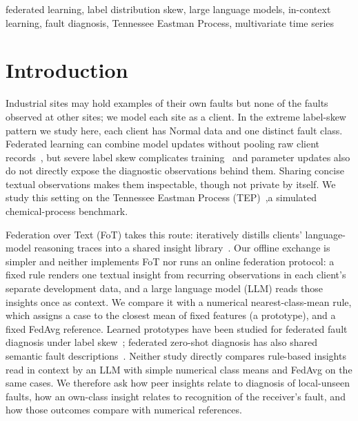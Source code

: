 \documentclass[conference]{IEEEtran}
\newcommand{\TEP}{TEP}
\begin{document}
\begin{IEEEkeywords}
federated learning, label distribution skew, large language models, in-context learning, fault diagnosis, Tennessee Eastman Process, multivariate time series
\end{IEEEkeywords}

\section{Introduction}
\label{sec:intro}
Industrial sites may hold examples of their own faults but none of the faults observed at other sites; we model each site as a client. In the extreme label-skew pattern we study here, each client has Normal data and one distinct fault class. Federated learning can combine model updates without pooling raw client records~\cite{mcmahan2017fedavg}, but severe label skew complicates training~\cite{li2022noniid} and parameter updates also do not directly expose the diagnostic observations behind them. Sharing concise textual observations makes them inspectable, though not private by itself. We study this setting on the Tennessee Eastman Process (\TEP{})~\cite{downs1993tep,bathelt2015tep},a simulated chemical-process benchmark.

Federation over Text (FoT)\cite{yao2026fot} takes this route: iteratively distills clients' language-model reasoning traces into a shared insight library~\cite{yao2026fot}. Our offline exchange is simpler and neither implements FoT nor runs an online federation protocol: a fixed rule renders one textual insight from recurring observations in each client's separate development data, and a large language model (LLM) reads those insights once as context. We compare it with a numerical nearest-class-mean rule, which assigns a case to the closest mean of fixed features (a prototype), and a fixed FedAvg reference. Learned prototypes have been studied for federated fault diagnosis under label skew~\cite{fan2025prototype}; federated zero-shot diagnosis has also shared semantic fault descriptions~\cite{li2023fedzsl}. Neither study directly compares rule-based insights read in context by an LLM with simple numerical class means and FedAvg on the same cases. We therefore ask how peer insights relate to diagnosis of local-unseen faults, how an own-class insight relates to recognition of the receiver's fault, and how those outcomes compare with numerical references.
\end{document}
